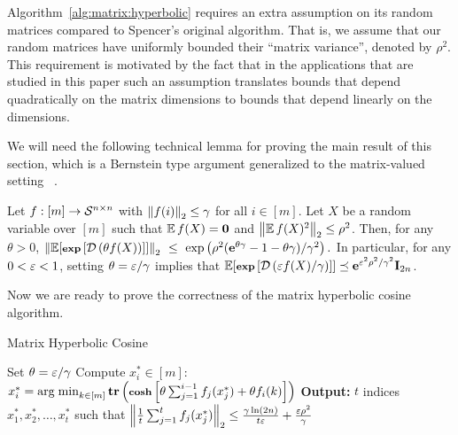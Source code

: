 %
Algorithm~\ref{alg:matrix:hyperbolic} requires an extra assumption on its random matrices compared to Spencer's original algorithm. That is, we assume that our random matrices have uniformly bounded their ``matrix variance'', denoted by $\rho^2$. This requirement is motivated by the fact that in the applications that are studied in this paper such an assumption translates bounds that depend quadratically on the matrix dimensions to bounds that depend linearly on the dimensions.
%

%
We will need the following technical lemma for proving the main result of this section, which is a Bernstein type argument generalized to the matrix-valued setting~ \cite{chernoff:matrix_valued:Tropp}.
\begin{lemma}\label{lem:bounding_w}
Let $f:[m] \to \mathcal{S}^{n\times n}$ with $\left\|f(i)\right\|_2 \leq \gamma$ for all $i\in{[m]}$. Let $X$ be a random variable over $[m]$ such that $\operatorname{\mathbb{E}}{f(X)}=\mathbf{0}$ and $\left\|\operatorname{\mathbb{E}} f(X)^2 \right\|_2 \leq \rho^2$. Then, for any $\theta >0$, $\norm{\EE [ \expm{ \dil{ \theta f(X)} }]}\ \leq\ \exp\left( \rho^2( \e^{\theta \gamma } -1 - \theta \gamma )/ \gamma^2\right).$ In particular, for any $0 < \varepsilon < 1$, setting $\theta = \varepsilon /\gamma$ implies that $\operatorname{\mathbb{E}} [ \operatorname{\textbf{\footnotesize exp}}\left[ \mathcal{D}\left( \varepsilon f(X) / \gamma\right) \right]] \preceq {\mathbf e}^{\varepsilon^2 \rho^2 / \gamma^2} \mathbf{I}_{2n}$.
\end{lemma}
%
Now we are ready to prove the correctness of the matrix hyperbolic cosine algorithm.
%
\begin{algorithm}{}
	\caption{Matrix Hyperbolic Cosine}\label{alg:matrix:hyperbolic}
\begin{algorithmic}[1]
\State Set $\theta = \varepsilon /\gamma $
	\State Compute $x_i^*\in{[m]}$: $ x_i^* = \operatorname*{arg\; min}_{k\in{[m]}}\operatorname{\textbf{tr}}\left(\operatorname{\textbf{\footnotesize cosh}}\left[ \theta \sum_{j=1}^{i-1} f_j(x_j^*) + \theta f_i(k) \right]\right) $
\EndFor
\State \textbf{Output:} $t$ indices $x_1^*, x_2^*, \ldots ,x_t^*$ such that $\left\| \frac1{t} \sum_{j=1}^{t} f_j(x_j^*) \right\|_2 \leq \frac{\gamma \ln( 2n)}{t\varepsilon } + \frac{\varepsilon\rho^2}{\gamma} $
\EndProcedure
\end{algorithmic}
\end{algorithm}
